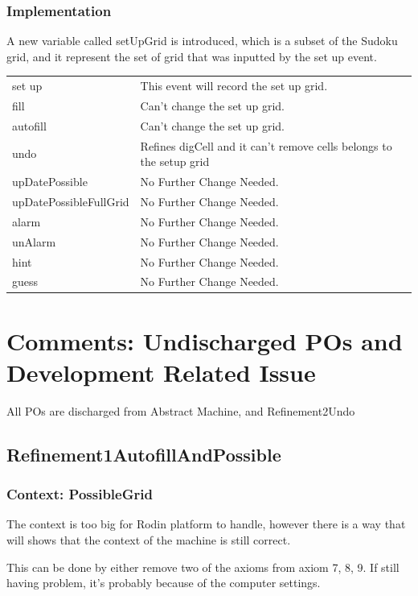 \documentclass[a4paper]{article}
\begin{document}
\subsubsection{Implementation}
\indent\indent A new variable called setUpGrid is introduced, which is a subset of the Sudoku grid, and it represent the set of grid that was inputted by the set up event.
\begin{center}
\begin{tabular}{|p{3.5cm}|p{10cm}|}
\hline
\color{blue}{Event} & \color{blue}{Usage}\\
\hline
set up & This event will record the set up grid.\\
\hline
fill & Can't change the set up grid.\\
\hline
autofill & Can't change the set up grid.\\
\hline
undo & Refines digCell and it can't remove cells belongs to the setup grid\\
\hline
upDatePossible & No Further Change Needed.\\
\hline
upDatePossibleFullGrid & No Further Change Needed.\\
\hline
alarm & No Further Change Needed.\\
\hline
unAlarm & No Further Change Needed.\\
\hline
hint & No Further Change Needed.\\
\hline
guess & No Further Change Needed.\\
\hline
\end{tabular}
\end{center}

\section{Comments: Undischarged POs and Development Related Issue}
All POs are discharged from Abstract Machine, and Refinement2Undo
\subsection{Refinement1AutofillAndPossible}
\subsubsection{Context: PossibleGrid}

\indent\indent The context is too big for Rodin platform to handle, however there is a way that will shows that the context of the machine is still correct.

This can be done by either remove two of the axioms from axiom 7, 8, 9.
If still having problem, it's probably because of the computer settings.
\end{document}
